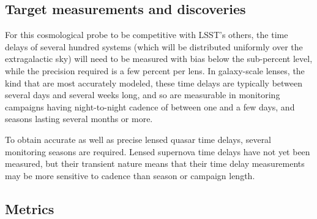 
\subsection{Target measurements and discoveries}
\label{sec:lenstimedelays:targets}


For this cosmological probe to be competitive with LSST's others, the
time delays of several hundred systems (which will be distributed
uniformly over the extragalactic sky) will need to be measured with
bias below the sub-percent level, while the precision required is a
few percent per lens.  In galaxy-scale lenses, the kind that are most
accurately modeled, these time delays are typically between several
days and several weeks long, and so are measurable in monitoring
campaigns having night-to-night cadence of between one and a few days,
and seasons lasting several months or more.


To obtain accurate as well as precise lensed quasar time delays, several monitoring seasons are required. Lensed supernova time delays have not yet been measured, but their transient nature means that their time delay measurements may be more sensitive to cadence than season or campaign length.


\subsection{Metrics}
\label{sec:lenstimedelays:metrics}


